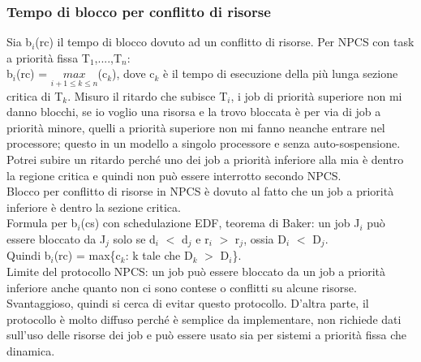 \documentclass{article}
\begin{document}
\subsubsection{Tempo di blocco per conflitto di risorse}
Sia b$_{i}$(rc) il tempo di blocco dovuto ad un conflitto di risorse. Per NPCS con task a priorità fissa T$_{1}$,....,T$_{n}$:\\
b$_{i}$(rc) = $\underset{i+1 \leq k \leq n}{max}$(c$_{k}$), dove c$_{k}$ è il tempo di esecuzione della più lunga sezione critica di T$_{k}$. Misuro il ritardo che subisce T$_{i}$, i job di priorità superiore non mi danno blocchi, se io voglio una risorsa e la trovo bloccata è per via di job a priorità minore, quelli a priorità superiore non mi fanno neanche entrare nel processore; questo in un modello a singolo processore e senza auto-sospensione.\\ Potrei subire un ritardo perché uno dei job a priorità inferiore alla mia è dentro la regione critica e quindi non può essere interrotto secondo NPCS.\\ Blocco per conflitto di risorse in NPCS è dovuto al fatto che un job a priorità inferiore è dentro la sezione critica.\\ Formula per b$_{i}$(cs) con schedulazione EDF, teorema di Baker: un job J$_{i}$ può essere bloccato da J$_{j}$ solo se d$_{i}$ $<$ d$_{j}$ e r$_{i}$ $>$ r$_{j}$, ossia D$_{i}$ $<$ D$_{j}$.\\ Quindi b$_{i}$(rc) = max\{c$_{k}$: k tale che D$_{k}$ $>$ D$_{i}$\}.\\ Limite del protocollo NPCS: un job può essere bloccato da un job a priorità inferiore anche quanto non ci sono contese o conflitti su alcune risorse. Svantaggioso, quindi si cerca di evitar questo protocollo. D'altra parte, il protocollo è molto diffuso perché è semplice da implementare, non richiede dati sull'uso delle risorse dei job e può essere usato sia per sistemi a priorità fissa che dinamica.
\end{document}

